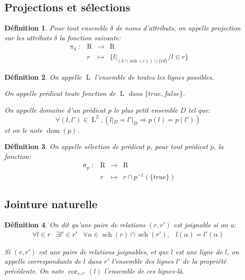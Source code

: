 \documentclass[french]{article}
\DeclareMathOperator{\proj}{\pi}
\DeclareMathOperator{\sel}{\sigma}
\DeclareMathOperator{\dom}{dom}
\DeclareMathOperator{\R}{R}
\DeclareMathOperator{\s}{sch}
\DeclareMathOperator{\ls}{L}
\DeclareMathOperator{\cor}{cor}
\newcommand{\projDelta}{\proj_{\delta}}
\newcommand{\selP}{\sel_p}
\newtheorem{defi}{Définition}
\begin{document}
\subsection*{Projections et sélections}
\begin{defi}
	Pour tout ensemble $\delta$ de noms d'attributs,
	on appelle \emph{projection sur les attributs $\delta$}
	la fonction suivante:
	$$
	\begin{array}{llcl}
	\projDelta:	& \R 	& \rightarrow 	& \R \\
				& r		& \mapsto		& 
					\{{l|}_{(\delta\cap \s(r)) \cup \{id\}} / l \in r \}
	\end{array}
	$$
\end{defi}

\begin{defi}
	On appelle $\ls$ l'ensemble de toutes les lignes possibles.
	
	On appelle \emph{prédicat} toute fonction
	de $\ls$ dans $\{true, false\}$.
	
	On appelle \emph{domaine} d'un prédicat $p$ le plus petit
	ensemble $D$ tel que:
	$$
	\forall (l, l') \in \ls^2, (l|_D = l'|_D \Rightarrow  p(l) = p(l')) 
	$$
	et on le note $\dom(p)$.
\end{defi}

\begin{defi}
	On appelle \emph{sélection de prédicat $p$}, pour tout prédicat $p$, la fonction:
	$$
	\begin{array}{llcl}
	\selP: 	& \R 	& \rightarrow 	& \R \\
			& r		& \mapsto		& r \cap p^{-1}(\{true\})
	\end{array}
	$$
\end{defi}

\subsection*{Jointure naturelle}
\begin{defi}
	On dit qu'\emph{une paire de relations} $(r,r')$ 
	est \emph{joignable} si on a:
	$$
	\begin{array}{lllr}
	\forall l \in r &
	\exists l' \in r' &
	\forall \alpha \in \s(r) \cap \s(r'), &
	l(\alpha) = l'(\alpha)
	\end{array}
	$$
	
	Si $(r,r')$ est une paire de relations joignables,
	et que $l$ est une ligne de $l$,
	on appelle \emph{correspondants de $l$ dans $r'$}
	l'ensemble des lignes $l'$ de la propriété précédente.
	On note $\cor_{r, r'}(l)$ l'ensemble de ces lignes-là.
\end{defi}
\end{document}
